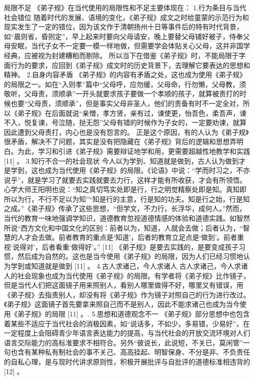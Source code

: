 \documentclass[a4paper,12pt,UTF8,twoside]{ctexbook}
\begin{document}
局限不足
《弟子规》在当代使用的局限性和不足主要体现在：
1.行为条目与当代社会错位
随着时代的发展、语境的变化，《弟子规》成文之时给童蒙的示范行为和现实发生了一定的错位，因为该文作于清朝扬州十日等事件后的特有时代背景，如“晨则省，昏则定”，早上起来时要向父母请安，晚上要替父母铺好被子，侍奉父母安眠，当代子女不一定要一模一样地做，但需要学会体贴关心父母，这并非国学经典，应被视为封建糟粕而剔除。
所以当下在借鉴《弟子规》时，不能局限于字面行为的要求，应回到《弟子规》成文时的历史背景下，去理解它要表达的思想和精神。
2.自身内容矛盾
《弟子规》的内容有矛盾之处，这也成为使用《弟子规》的局限之一。如在“入则孝”篇中“父母呼，应勿缓，父母命，行勿懒，父母教，须敬听，父母责，须顺承”一开头就要求孩子要做一个孝顺的孩子，就算被责打的时候也要“父母责，须顺承”，但是事实父母非圣人，他们的责备有时不一定全对，所以《弟子规》在后面就说“亲憎，孝方贤，亲有过，谏使更，怡吾色，柔吾声，谏不入，悦复谏，号泣随，挞无怨”父母有错的时候作为子女的，一定要劝谏，就算因此遭到父母责打，内心也是没有怨言的。
正是这个原因，有的人认为《弟子规》很矛盾，解决不了问题，其实是没有把隐藏在《弟子规》背后的逻辑和思想弄明白。为此，学习和引进《弟子规》需要辩证地学和用，更需要超越性地教学和实践 [11]
。
3.知行不合一的社会现状
今人以为学到、知道就是做到，古人认为做到才是学到，这也成为当代使用《弟子规》的局限。《论语》中说：“学而时习之，不亦说乎”，就是学习了就要去实践就要去力行，这样才能有所收获，才会有所领悟。心学大师王阳明也说：“知之真切笃实处即是行，行之明觉精察处即是知。真知即所以为行，不行不足以为知”“知是行的主意，行是知的功夫。知是行之始，行是知之成。”《弟子规》传承了这些思想，“但学文，不力行，长浮华，成何人。”然而，当代的教育一味地强调学知识，道德教育忽视道德情感的体验和道德实践。如智然所说“西方文化和中国文化的区别：前者以为，知道，人就会去做；后者认为，“智慧的人才会去做。前者教育的重点是‘知道’，后者的教育立足点是‘做到’。前者重视‘说得对’，后者看重‘做得好’。” [11]
《弟子规》是要去实践的，是要变成孩子习惯，然后成为自然的。这也是当今使用《弟子规》的局限，因为人们已经习惯地认为学到或知道就是做到 [11]
。
4.古人求诸己，今人求诸人
古人求诸己，今人求诸人的社会现象也成为当代使用《弟子规》的局限。有学者将《弟子规》比作镜子，但是当代人们把这面镜子用来照别人，看别人哪里做得不好，哪里又有错误，用《弟子规》去指责别人，却没有将《弟子规》作为镜子对照自己的行为进行改过。《弟子规》这面镜子首先要拿来照自己而不是别人，因此不能求诸己也成为当今使用《弟子规》的局限 [11]
。.
5.思想和道德观念不一
《弟子规》部分思想中也包含着某些不适应于当代社会的消极因素，如“说话多，不如少，多易错，少易好”，在一定程度上会阻碍青少年语言表达能力的提高，与当代社会的开放交流环境对人们语言交际能力的高标准要求不相符合。另外“彼说长，此说短，不关已，莫闲管”一句也含有某种私有制社会的事不关己、高高挂起、明智保身、不分是非、不负责任的自私心理，是与现时代讲求原则性，积极开展批评与自批评的道德标准相违背的 [12]
。
\end{document}
